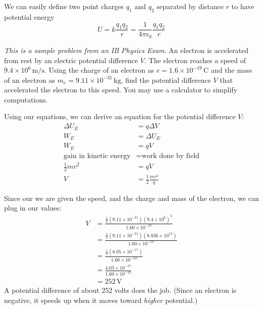 We can easily define two point charges $q_1$ and $q_2$ separated by distance $r$ to have potential energy
\begin{equation}
	U=k\frac{q_1q_2}{r}=\frac{1}{4\pi \epsilon_0}\frac{q_1q_2}{r}
\end{equation}
\begin{Exercise}[title={Accelerating an Electron}, label={ex:electron_accel_epd}]
	\textit{This is a sample problem from an IB Physics Exam}.
An electron is accelerated from rest by an electric potential difference $V$. The electron reaches a speed of $9.4 \times 10^6 \, \textrm{m/s}$. Using the charge of an electron as $e = 1.6 \times 10^{-19} \, \textrm{C}$ and the mass of an electron as $m_e = 9.11 \times 10^{-31} \, \textrm{kg}$, find the potential difference $V$ that accelerated the electron to this speed. You may use a calculator to simplify computations.
\end{Exercise}
\begin{Answer}[ref={ex:electron_accel_epd}]

Using our equations, we can derive an equation for the potential difference $V$:
\begin{align*}
	\Delta U_E &= q\Delta V \\
	W_E &= \Delta U_E \\
	W_E &= qV \\
	\text{gain in kinetic energy} &= \text{work done by field} \\
	\frac{1}{2}mv^2 &= qV \\
	V &= \frac{1}{2}\frac{mv^2}{q}
\end{align*}

Since our we are given the speed, and the charge and mass of the electron, we can plug in our values:
\begin{align*}
	V&=\frac{\frac12(9.11\times10^{-31})(9.4\times10^6)^2}{1.60\times10^{-19}}\\
	&=\frac{\frac12(9.11\times10^{-31})(8.836\times10^{13})}{1.60\times10^{-19}}\\
	&=\frac{\frac12 (8.05\times10^{-17})}{1.60\times10^{-19}}\\
	&=\frac{4.03\times10^{-17}}{1.60\times10^{-19}}\\
	&=252 \, \textrm{V}
\end{align*}
A potential difference of about 252 volts does the job. (Since an electron
is negative, it speeds up when it moves toward \emph{higher} potential.)
\end{Answer}
